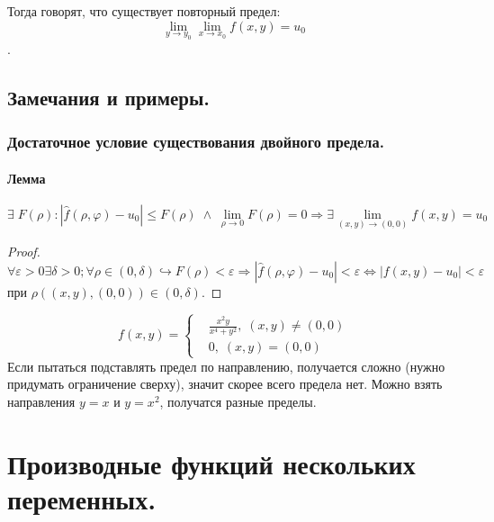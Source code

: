 \documentclass{article}
\begin{document}
Тогда говорят, что существует повторный предел:
$$\lim\limits_{y\to y_0}\lim\limits_{x\to x_0} f(x,y) = u_0$$.


\newpage
\subsection{Замечания и примеры.}
\subsubsection{Достаточное условие существования двойного предела.}
\paragraph*{Лемма}$$\exists \; F(\rho) : |\hat{f}(\rho,\varphi) - u_0| \leq F(\rho) \; \wedge  \; \lim\limits_{\rho\to0}F(\rho)=0 \Rightarrow \exists \lim\limits_{(x,y)\to(0,0)}f(x,y)=u_0$$
\begin{proof}
$$ \forall \varepsilon > 0 \exists \delta > 0; \forall \rho \in (0, \delta ) \hookrightarrow F(\rho) < \varepsilon  \Rightarrow |\hat{f}(\rho,\varphi) - u_0| < \varepsilon \Leftrightarrow |f(x,y) - u_0| < \varepsilon$$
при $\rho((x,y), (0,0) )\in(0, \delta)$.
\end{proof}
\begin{equation*}
    f(x,y) = \left\{
    \begin{aligned}
         & \frac{x^2 y}{x^4 + y^2}, \; (x,y) \neq (0,0) \\
         & 0, \; (x,y) = (0,0)
    \end{aligned}
    \right.
\end{equation*}
Если пытаться подставлять предел по направлению, получается сложно (нужно придумать ограничение сверху), значит скорее всего предела нет.
Можно взять направления $y = x$ и $y = x^2$, получатся разные пределы.

\newpage

\section{Производные функций нескольких переменных.}
\end{document}
